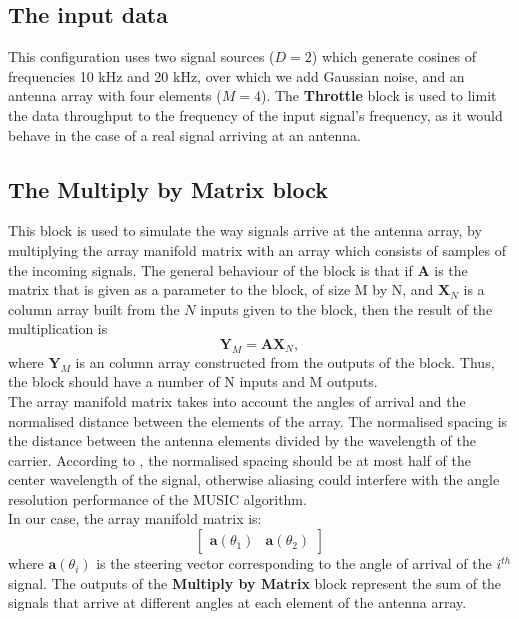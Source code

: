 \subsection{The input data}
This configuration uses two signal sources ($D = 2$) which generate cosines of
frequencies 10 kHz and 20 kHz, over which we add Gaussian noise, and an antenna
array with four elements ($M = 4$). The \textbf{Throttle} block is
used to limit the data throughput to the frequency of the input signal's
frequency, as it would behave in the case of a real signal arriving at an
antenna.

\subsection{The Multiply by Matrix block}
This block is used to simulate the way signals arrive at the antenna array, by
multiplying the array manifold matrix with an array which consists of samples of
the incoming signals. The general behaviour of the block is that if $\bm{A}$ is
the matrix that is given as a parameter to the block, of size M by N, and
$\bm{X}_N$ is a column array built from the $N$ inputs given to the block, then
the result of the multiplication is
\begin{equation}
\bm{Y}_M = \bm{A}\bm{X}_N,
\end{equation}
where $\bm{Y}_M$ is an column array constructed from the outputs of the block.
Thus, the block should have a number of N inputs and M outputs. \\

The array manifold matrix takes into account the angles of arrival and the
normalised distance between the elements of the array. The normalised spacing is
the distance between the antenna elements divided by the wavelength of the
carrier. According to \cite{cite:ettus-doa}, the normalised spacing should be at
most half of the center wavelength of the signal, otherwise aliasing could
interfere with the angle resolution performance of the MUSIC algorithm. \\

In our case, the array manifold matrix is:
\begin{displaymath}
    \begin{bmatrix}
        \bm{a}(\theta_1) & \bm{a}(\theta_2)
    \end{bmatrix}
\end{displaymath}
where $\bm{a}(\theta_i)$ is the steering vector corresponding to the angle of
arrival of the $i^{th}$ signal. The outputs of the \textbf{Multiply by Matrix}
block represent the sum of the signals that arrive at different angles at each
element of the antenna array.

